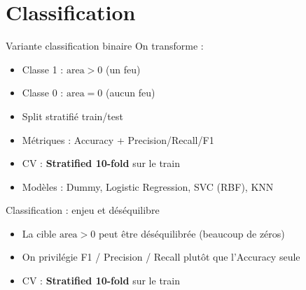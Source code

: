 \documentclass[aspectratio=169,11pt]{beamer}
\newcommand{\Area}{\ensuremath{\mathrm{area}}}
\begin{document}
\section{Classification}

\begin{frame}{Variante classification binaire}
  On transforme :
  \begin{itemize}
    \item Classe 1 : $\Area>0$ (un feu)
    \item Classe 0 : $\Area=0$ (aucun feu)
  \end{itemize}

  \vspace{0.6em}
  \begin{itemize}
    \item Split stratifi\'e train/test
    \item M\'etriques : Accuracy + Precision/Recall/F1
    \item CV : \textbf{Stratified 10-fold} sur le train
    \item Mod\`eles : Dummy, Logistic Regression, SVC (RBF), KNN
  \end{itemize}
\end{frame}

\begin{frame}{Classification : enjeu et d\'es\'equilibre}
  \begin{itemize}
    \item La cible $\Area>0$ peut \^etre d\'es\'equilibr\'ee (beaucoup de z\'eros)
    \item On privil\'egie F1 / Precision / Recall plut\^ot que l'Accuracy seule
    \item CV : \textbf{Stratified 10-fold} sur le train
  \end{itemize}
\end{frame}
\end{document}
